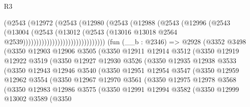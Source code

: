 \begin{lexlean}{R3}
\begin{coremodule}
                                      (@2543
                                        (@12972
                                          (@2543
                                            (@12980
                                              (@2543
                                                (@12988
                                                  (@2543
                                                    (@12996
                                                      (@2543
                                                        (@13004
                                                          (@2543
                                                            (@13012
                                                              (@2543
                                                                (@13016
                                                                  @13018
                                                                  @2564
                                                                  @2539)))))))))))))))))))))))))))))))
    (fun (__b : @2346) =>
    @2928
      (@3352
        @3498
        (@3350
          @12903
          @12906
          @3505
          (@3350
            @12911
            @12914
            @3512
            (@3350
              @12919
              @12922
              @3519
              (@3350
                @12927
                @12930
                @3526
                (@3350
                  @12935
                  @12938
                  @3533
                  (@3350
                    @12943
                    @12946
                    @3540
                    (@3350
                      @12951
                      @12954
                      @3547
                      (@3350
                        @12959
                        @12962
                        @3554
                        (@3350
                          @12967
                          @12970
                          @3561
                          (@3350
                            @12975
                            @12978
                            @3568
                            (@3350
                              @12983
                              @12986
                              @3575
                              (@3350
                                @12991
                                @12994
                                @3582
                                (@3350
                                  @12999
                                  @13002
                                  @3589
                                  (@3350

\end{coremodule}
\end{lexlean}
